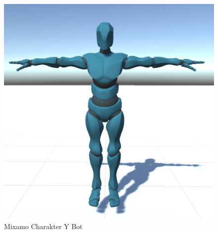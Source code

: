 \begin{figure}[H]
  \centering  
  \includegraphics[scale=0.5]{img/charakter_mixamo}
  \caption{Mixamo Charakter Y Bot}
  \label{fig:charakter_mixamo}
\end{figure}

